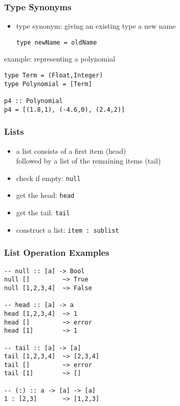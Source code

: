 \documentclass[dvipsnames]{beamer}
\theoremstyle{plain}
\begin{document}
\begin{frame}[fragile]
  \frametitle{Type Synonyms}

  \begin{itemize}
    \item type synonym: giving an existing type a new name
    \smallskip
    \begin{lstlisting}
type newName = oldName
    \end{lstlisting}
  \end{itemize}

  \pause
  \begin{exampleblock}{example: representing a polynomial}
    \begin{lstlisting}
type Term = (Float,Integer)
type Polynomial = [Term]

p4 :: Polynomial
p4 = [(1.8,1), (-4.6,0), (2.4,2)]
    \end{lstlisting}
  \end{exampleblock}
\end{frame}

\begin{frame}
  \frametitle{Lists}

  \begin{itemize}
    \item a list consists of a first item (\alert{head})\\
      followed by a list of the remaining items (\alert{tail})

    \medskip
    \item check if empty: \lstinline{null}
    \item get the head: \lstinline{head}
    \item get the tail: \lstinline{tail}
    \item construct a list: \lstinline{item : sublist}
  \end{itemize}
\end{frame}

\begin{frame}[fragile]
  \frametitle{List Operation Examples}

  \begin{lstlisting}
-- null :: [a] -> Bool
null []         ~> True
null [1,2,3,4]  ~> False

-- head :: [a] -> a
head [1,2,3,4]  ~> 1
head []         ~> error
head [1]        ~> 1

-- tail :: [a] -> [a]
tail [1,2,3,4]  ~> [2,3,4]
tail []         ~> error
tail [1]        ~> []

-- (:) :: a -> [a] -> [a]
1 : [2,3]       ~> [1,2,3]
  \end{lstlisting}
\end{frame}
\end{document}
